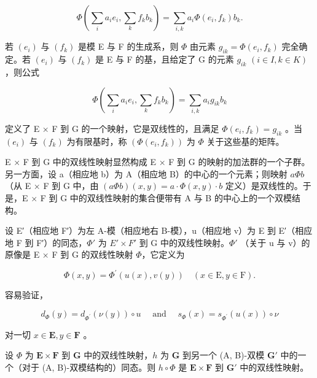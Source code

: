 \[
\Phi (\sum_ {i} a _ {i} e _ {i}, \sum_ {k} f _ {k} b _ {k}) = \sum_ {i, k} a _ {i} \Phi (e _ {i}, f _ {k}) b _ {k}.\tag{6}
\]

若 \((e_{i})\) 与 \((f_{k})\) 是模 E 与 F 的生成系，则 \(\Phi\) 由元素 \(g_{ik} = \Phi(e_{i}, f_{k})\) 完全确定。若 \((e_{i})\) 与 \((f_{k})\) 是 E 与 F 的基，且给定了 G 的元素 \(g_{ik}\) \((i \in I, k \in K)\)，则公式

\[
\Phi (\sum_ {i} a _ {i} e _ {i}, \sum_ {k} f _ {k} b _ {k}) = \sum_ {i, k} a _ {i} g _ {i k} b _ {k}\tag{6'}
\]

定义了 E × F 到 G 的一个映射，它是双线性的，且满足 \(\Phi(e_{i}, f_{k}) = g_{ik}\) 。当 \((e_{i})\) 与 \((f_{k})\) 为有限基时，称 \((\Phi(e_{i}, f_{k}))\) 为 \(\Phi\) 关于这些基的矩阵。

E × F 到 G 中的双线性映射显然构成 E × F 到 G 的映射的加法群的一个子群。另一方面，设 a（相应地 b）为 A（相应地 B）的中心的一个元素；则映射 \(a\Phi b\) （从 E × F 到 G 中，由 \((a\Phi b)(x, y) = a \cdot \Phi(x, y) \cdot b\) 定义）是双线性的。于是，E × F 到 G 中的双线性映射的集合便带有 A 与 B 的中心上的一个双模结构。

设 E′（相应地 F′）为左 A-模（相应地右 B-模），u（相应地 v）为 E 到 E′（相应地 F 到 F′）的同态，\(\Phi'\) 为 \(E' \times F'\) 到 G 中的双线性映射。\(\Phi'\) （关于 u 与 v）的原像是 E × F 到 G 的双线性映射 \(\Phi\)，它定义为

\[
\Phi (x, y) = \Phi^ {\prime} (u (x), v (y)) \quad (x \in \mathrm{E}, y \in \mathrm{F}).
\]

容易验证，

\[
d _ {\Phi} (y) = d _ {\Phi^ {\prime}} (\nu (y)) \circ u \quad \text { and } \quad s _ {\Phi} (x) = s _ {\Phi^ {\prime}} (u (x)) \circ \nu
\]

对一切 \(x \in \mathbf{E}, y \in \mathbf{F}\) 。

设 \(\Phi\) 为 \(\mathbf{E} \times \mathbf{F}\) 到 \(\mathbf{G}\) 中的双线性映射，\(h\) 为 \(\mathbf{G}\) 到另一个 (A, B)-双模 \(\mathbf{G}'\) 中的一个（对于 (A, B)-双模结构的）同态。则 \(h \circ \Phi\) 是 \(\mathbf{E} \times \mathbf{F}\) 到 \(\mathbf{G}'\) 中的双线性映射。


